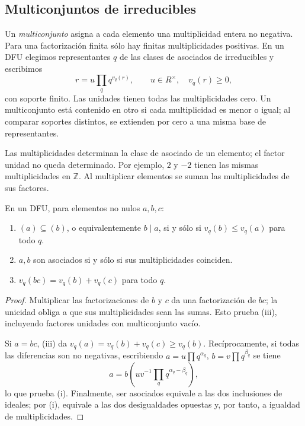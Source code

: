 \subsection{Multiconjuntos de irreducibles}
Un \emph{multiconjunto} asigna a cada elemento una multiplicidad entera no negativa. Para una factorización finita sólo hay finitas multiplicidades positivas. En un DFU elegimos representantes $q$ de las clases de asociados de irreducibles y escribimos
\[
r=u\prod_q q^{v_q(r)},\qquad
u\in R^\times,\quad v_q(r)\geq0,
\]
con soporte finito. Las unidades tienen todas las multiplicidades cero. Un multiconjunto está contenido en otro si cada multiplicidad es menor o igual; al comparar soportes distintos, se extienden por cero a una misma base de representantes.
\begin{obs}
Las multiplicidades determinan la clase de asociado de un elemento; el factor unidad no queda determinado. Por ejemplo, $2$ y $-2$ tienen las mismas multiplicidades en $\mathbb Z$. Al multiplicar elementos se suman las multiplicidades de sus factores.
\end{obs}

\begin{lema}\label{lema:C16-multiplicidades}
En un DFU, para elementos no nulos $a,b,c$:
\begin{enumerate}[label=\textup{(\roman*)}]
\item $(a)\subseteq(b)$, o equivalentemente $b\mid a$, si y sólo si $v_q(b)\leq v_q(a)$ para todo $q$.
\item $a,b$ son asociados si y sólo si sus multiplicidades coinciden.
\item $v_q(bc)=v_q(b)+v_q(c)$ para todo $q$.
\end{enumerate}
\end{lema}
\begin{proof}
Multiplicar las factorizaciones de $b$ y $c$ da una factorización de $bc$; la unicidad obliga a que sus multiplicidades sean las sumas. Esto prueba (iii), incluyendo factores unidades con multiconjunto vacío.

Si $a=bc$, (iii) da $v_q(a)=v_q(b)+v_q(c)\geq v_q(b)$. Recíprocamente, si todas las diferencias son no negativas, escribiendo $a=u\prod q^{\alpha_q}$, $b=v\prod q^{\beta_q}$ se tiene
\[
a=b\left(uv^{-1}\prod_q q^{\alpha_q-\beta_q}\right),
\]
lo que prueba (i). Finalmente, ser asociados equivale a las dos inclusiones de ideales; por (i), equivale a las dos desigualdades opuestas y, por tanto, a igualdad de multiplicidades.
\end{proof}

